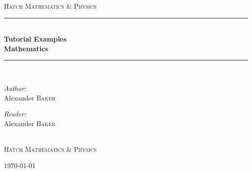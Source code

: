 \documentclass[a4paper]{report}
\newcommand{\HRule}{\rule{\linewidth}{0.5mm}}
\begin{document}
\begin{titlepage}

\begin{center}

\textsc{\Large Hatch Mathematics \& Physics }\\[0.5cm]

\HRule \\[0.4cm]
{\huge \bfseries Tutorial Examples}\\[0.4cm]
{\huge \bfseries Mathematics}\\[0.4cm]
\HRule \\[1.5cm]

\begin{minipage}{0.4\textwidth}
\begin{flushleft} \large
\emph{Author:}\\
Alexander \textsc{Baker}
\end{flushleft}
\end{minipage}
\begin{minipage}{0.5\textwidth}
\begin{flushright} \large
\emph{Reader:} \\
Alexander \textsc{Baker} 

\end{flushright}
\end{minipage}
\\[4cm]
\textsc{\LARGE Hatch Mathematics \& Physics}\\[1.5cm]

\vfill

{\large \today}

\end{center}

\end{titlepage}

\newpage

\pagestyle{empty} %
\tableofcontents %
\cleardoublepage %
\pagestyle{plain} %
\setcounter{page}{1} %

\newpage



\end{document}
